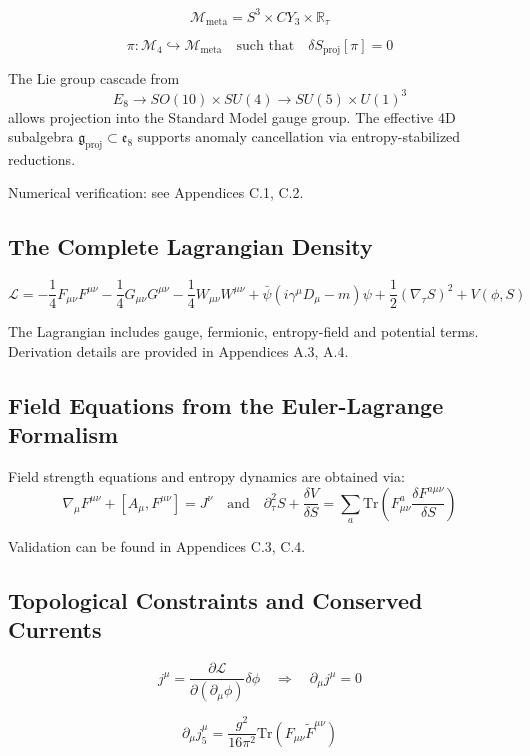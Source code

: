 \documentclass[10.5pt,a4paper]{article}
\begin{document}
\[
\mathcal{M}_{\text{meta}} = S^3 \times CY_3 \times \mathbb{R}_\tau
\]

\[
\pi: \mathcal{M}_4 \hookrightarrow \mathcal{M}_{\text{meta}} \quad \text{such that} \quad \delta S_{\text{proj}}[\pi] = 0
\]

The Lie group cascade from 
\[
E_8 \rightarrow SO(10) \times SU(4) \rightarrow SU(5) \times U(1)^3
\]
allows projection into the Standard Model gauge group. The effective 4D subalgebra 
\(\mathfrak{g}_{\text{proj}} \subset \mathfrak{e}_8\) supports anomaly cancellation via entropy-stabilized reductions.

Numerical verification: see Appendices C.1, C.2.

\subsection{The Complete Lagrangian Density}

\[
\mathcal{L} = -\frac{1}{4} F_{\mu\nu}F^{\mu\nu} - \frac{1}{4} G_{\mu\nu}G^{\mu\nu} - \frac{1}{4} W_{\mu\nu}W^{\mu\nu} 
+ \bar{\psi}(i\gamma^\mu D_\mu - m)\psi + \frac{1}{2} (\nabla_\tau S)^2 + V(\phi, S)
\]

The Lagrangian includes gauge, fermionic, entropy-field and potential terms. Derivation details are provided in Appendices A.3, A.4.

\subsection{Field Equations from the Euler-Lagrange Formalism}

Field strength equations and entropy dynamics are obtained via:
\[
\nabla_\mu F^{\mu\nu} + [A_\mu, F^{\mu\nu}] = J^\nu \quad\text{and}\quad \partial_\tau^2 S + \frac{\delta V}{\delta S} = \sum_a \mathrm{Tr}\left( F^{a}_{\mu\nu} \frac{\delta F^{a\mu\nu}}{\delta S} \right)
\]

Validation can be found in Appendices C.3, C.4.

\subsection{Topological Constraints and Conserved Currents}

\[
j^\mu = \frac{\partial \mathcal{L}}{\partial (\partial_\mu \phi)} \delta \phi \quad \Rightarrow \quad \partial_\mu j^\mu = 0
\]

\[
\partial_\mu j_5^\mu = \frac{g^2}{16\pi^2} \mathrm{Tr}(F_{\mu\nu} \tilde{F}^{\mu\nu})
\]
\end{document}
